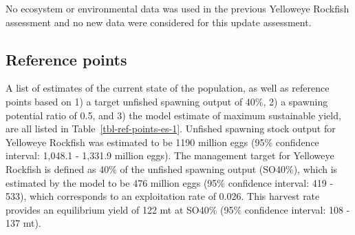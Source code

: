 \documentclass[
]{scrartcl}
\begin{document}
No ecosystem or environmental data was used in the previous Yelloweye
Rockfish assessment and no new data were considered for this update
assessment.

\subsection*{Reference points}\label{reference-points}

A list of estimates of the current state of the population, as well as
reference points based on 1) a target unfished spawning output of 40\%,
2) a spawning potential ratio of 0.5, and 3) the model estimate of
maximum sustainable yield, are all listed in
Table~\ref{tbl-ref-points-es-1}. Unfished spawning stock output for
Yelloweye Rockfish was estimated to be 1190 million eggs (95\%
confidence interval: 1,048.1 - 1,331.9 million eggs). The management
target for Yelloweye Rockfish is defined as 40\% of the unfished
spawning output (SO40\%), which is estimated by the model to be 476
million eggs (95\% confidence interval: 419 - 533), which corresponds to
an exploitation rate of 0.026. This harvest rate provides an equilibrium
yield of 122 mt at SO40\% (95\% confidence interval: 108 - 137 mt).

\clearpage

\begingroup
\fontsize{9.0pt}{10.8pt}\selectfont
\end{document}
